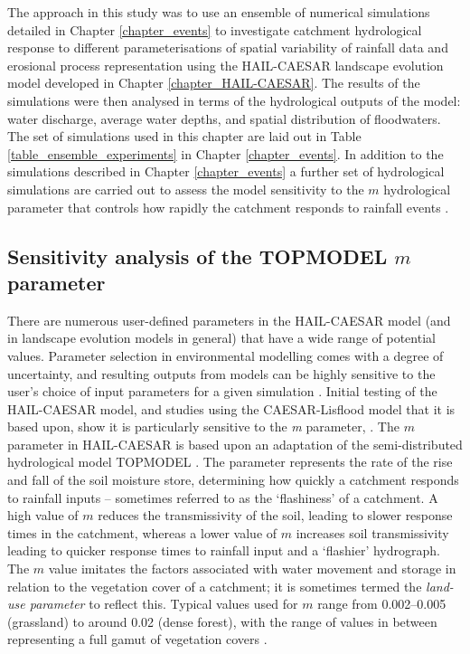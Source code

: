 The approach in this study was to use an ensemble of numerical simulations detailed in Chapter \ref{chapter_events} to investigate catchment hydrological response to different parameterisations of spatial variability of rainfall data and erosional process representation using the HAIL-CAESAR landscape evolution model developed in Chapter \ref{chapter_HAIL-CAESAR}. The results of the simulations were then analysed in terms of the hydrological outputs of the model: water discharge, average water depths, and spatial distribution of floodwaters. The set of simulations used in this chapter are laid out in Table \ref{table_ensemble_experiments} in Chapter \ref{chapter_events}. In addition to the simulations described in Chapter \ref{chapter_events} a further set of hydrological simulations are carried out to assess the model sensitivity to the \(m\) hydrological parameter that controls how rapidly the catchment responds to rainfall events \citep{beven1979physically}.

\subsection{Sensitivity analysis of the TOPMODEL \(m\) parameter}
There are numerous user-defined parameters in the HAIL-CAESAR model (and in landscape evolution models in general) that have a wide range of potential values. Parameter selection in environmental modelling comes with a degree of uncertainty, and resulting outputs from models can be highly sensitive to the user's choice of input parameters for a given simulation \citep{Pelletier2012}. Initial testing of the HAIL-CAESAR model, and studies using the CAESAR-Lisflood model that it is based upon, show it is particularly sensitive to the \textit{m} parameter, \citep{coulthard2002cellular,welsh2009testing}. The \(m\) parameter in HAIL-CAESAR is based upon an adaptation of the semi-distributed hydrological model TOPMODEL \citep{beven1979physically}. The parameter represents the rate of the rise and fall of the soil moisture store, determining how quickly a catchment responds to rainfall inputs -- sometimes referred to as the `flashiness' of a catchment. A high value of \(m\) reduces the transmissivity of the soil, leading to slower response times in the catchment, whereas a lower value of \(m\) increases soil transmissivity leading to quicker response times to rainfall input and a `flashier' hydrograph. The \(m\) value imitates the factors associated with water movement and storage in relation to the vegetation cover of a catchment; it is sometimes termed the \textit{land-use parameter} \citep{welsh2009testing} to reflect this. Typical values used for \(m\) range from 0.002--0.005 (grassland) to around 0.02 (dense forest), with the range of values in between representing a full gamut of vegetation covers \citep{beven1997topmodel,beven1984testing}.

